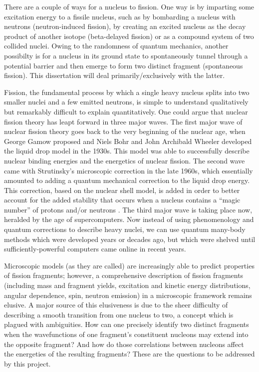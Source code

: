 There are  a couple of ways for a nucleus to fission. One way is by imparting some excitation energy to a fissile nucleus, such as by bombarding a nucleus with neutrons (neutron-induced fission), by creating an excited nucleus as the decay product of another isotope (beta-delayed fission) or as a compound system of two collided nuclei. Owing to the randomness of quantum mechanics, another possibilty is for a nucleus in its ground state to spontaneously tunnel through a potential barrier and then emerge to form two distinct fragment (spontaneous fission). This dissertation will deal primarily/exclusively with the latter.

Fission, the fundamental process by which a single heavy nucleus splits into two smaller nuclei and a few emitted neutrons, is simple to understand qualitatively but remarkably difficult to explain quantitatively. One could argue that nuclear fission theory has leapt forward in three major waves. The first major wave of nuclear fission theory goes back to the very beginning of the nuclear age, when George Gamow proposed and Niels Bohr and John Archibald Wheeler developed the liquid drop model in the 1930s. This model was able to successfully describe nuclear binding energies and the energetics of nuclear fission. The second wave came with Strutinsky’s microscopic correction in the late 1960s, which essentially amounted to adding a quantum mechanical correction to the liquid drop energy. This correction, based on the nuclear shell model, is added in order to better account for the added stability that occurs when a nucleus contains a ``magic number'' of protons and/or neutrons \cite{Strutinsky1967, Strutinsky1968, Brack1972}. The third major wave is taking place now, heralded by the age of supercomputers. Now instead of using phenomenology and quantum corrections to describe heavy nuclei, we can use quantum many-body methods which were developed years or decades ago, but which were shelved until sufficiently-powerful computers came online in recent years.

Microscopic models (as they are called) are increasingly able to predict properties of fission fragments; however, a comprehensive description of fission fragments (including mass and fragment yields, excitation and kinetic energy distributions, angular dependence, spin, neutron emission) in a microscopic framework remains elusive. A major source of this elusiveness is due to the sheer difficulty of describing a smooth transition from one nucleus to two, a concept which is plagued with ambiguities. How can one precisely identify two distinct fragments when the wavefunctions of one fragment’s constituent nucleons may extend into the opposite fragment? And how do those correlations between nucleons affect the energeties of the resulting fragments? These are the questions to be addressed by this project.

